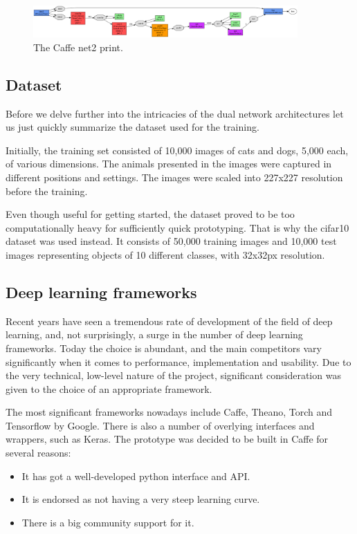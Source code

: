 \documentclass[a4paper, 12pt]{article}
\numberwithin{equation}{section}
\begin{document}
	\begin{figure}[!h]
		\centering
		\includegraphics[page=1,width=0.9\textwidth]{net2.png}
		\caption{\label{fig:net1}{The Caffe net2 print.}}
	\end{figure}

	\subsection{Dataset}

	Before we delve further into the intricacies of the dual network architectures let us just quickly summarize the dataset used for the training.

	Initially, the training set consisted of 10,000 images of cats and dogs, 5,000 each, of various dimensions. The animals presented in the images were captured in different positions and settings. The images were scaled into 227x227 resolution before the training.

	Even though useful for getting started, the dataset proved to be too computationally heavy for sufficiently quick prototyping. That is why the cifar10 dataset was used instead. It consists of 50,000 training images and 10,000 test images representing objects of 10 different classes, with 32x32px resolution.

	\subsection{Deep learning frameworks}
	Recent years have seen a tremendous rate of development of the field of deep learning, and, not surprisingly, a surge in the number of deep learning frameworks. Today the choice is abundant, and the main competitors vary significantly when it comes to performance, implementation and usability. Due to the very technical, low-level nature of the project, significant consideration was given to the choice of an appropriate framework.

	The most significant frameworks nowadays include Caffe, Theano, Torch and Tensorflow by Google. There is also a number of overlying interfaces and wrappers, such as Keras. The prototype was decided to be built in Caffe for several reasons:

	\begin{itemize}
		\item It has got a well-developed python interface and API.
		\item It is endorsed as not having a very steep learning curve.
		\item There is a big community support for it.
	\end{itemize}
\end{document}
